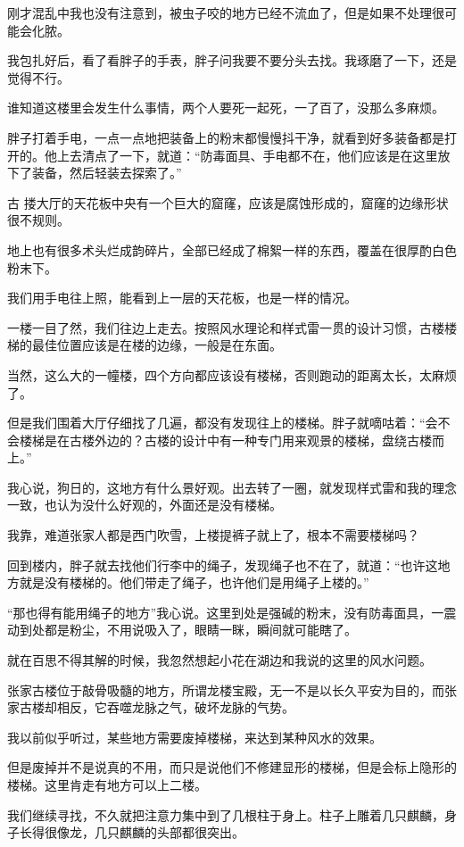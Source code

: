 刚才混乱中我也没有注意到，被虫子咬的地方已经不流血了，但是如果不处理很可能会化脓。

我包扎好后，看了看胖子的手表，胖子问我要不要分头去找。我琢磨了一下，还是觉得不行。

谁知道这楼里会发生什么事情，两个人要死一起死，一了百了，没那么多麻烦。

胖子打着手电，一点一点地把装备上的粉末都慢慢抖干净，就看到好多装备都是打开的。他上去清点了一下，就道：“防毒面具、手电都不在，他们应该是在这里放下了装备，然后轻装去探索了。”

古  搂大厅的天花板中央有一个巨大的窟窿，应该是腐蚀形成的，窟窿的边缘形状很不规则。

地上也有很多术头烂成韵碎片，全部已经成了棉絮一样的东西，覆盖在很厚酌白色粉末下。

我们用手电往上照，能看到上一层的天花板，也是一样的情况。

一楼一目了然，我们往边上走去。按照风水理论和样式雷一贯的设计习惯，古楼楼梯的最佳位置应该是在楼的边缘，一般是在东面。

当然，这么大的一幢楼，四个方向都应该设有楼梯，否则跑动的距离太长，太麻烦了。

但是我们围着大厅仔细找了几遍，都没有发现往上的楼梯。胖子就嘀咕着：“会不会楼梯是在古楼外边的？古楼的设计中有一种专门用来观景的楼梯，盘绕古楼而上。”

我心说，狗日的，这地方有什么景好观。出去转了一圈，就发现样式雷和我的理念一致，也认为没什么好观的，外面还是没有楼梯。

我靠，难道张家人都是西门吹雪，上楼提裤子就上了，根本不需要楼梯吗？

回到楼内，胖子就去找他们行李中的绳子，发现绳子也不在了，就道：“也许这地方就是没有楼梯的。他们带走了绳子，也许他们是用绳子上楼的。”

“那也得有能用绳子的地方”我心说。这里到处是强碱的粉末，没有防毒面具，一震动到处都是粉尘，不用说吸入了，眼睛一眯，瞬间就可能瞎了。

就在百思不得其解的时候，我忽然想起小花在湖边和我说的这里的风水问题。

张家古楼位于敲骨吸髓的地方，所谓龙楼宝殿，无一不是以长久平安为目的，而张家古楼却相反，它吞噬龙脉之气，破坏龙脉的气势。

我以前似乎听过，某些地方需要废掉楼梯，来达到某种风水的效果。

但是废掉并不是说真的不用，而只是说他们不修建显形的楼梯，但是会标上隐形的楼梯。这里肯走有地方可以上二楼。

我们继续寻找，不久就把注意力集中到了几根柱于身上。柱子上雕着几只麒麟，身子长得很像龙，几只麒麟的头部都很突出。

